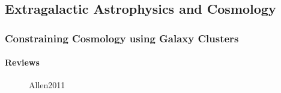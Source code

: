 \documentclass[letterpaper,10pt,english]{sphinxmanual}
\begin{document}
\subsection{Extragalactic Astrophysics and Cosmology}
\label{\detokenize{astro_reading:extragalactic-astrophysics-and-cosmology}}

\subsubsection{Constraining Cosmology using Galaxy Clusters}
\label{\detokenize{resource/astro/reference/cluster_cosmology:constraining-cosmology-using-galaxy-clusters}}\label{\detokenize{resource/astro/reference/cluster_cosmology::doc}}

\paragraph{Reviews}
\label{\detokenize{resource/astro/reference/cluster_cosmology:reviews}}
\begin{figure}[htbp]
\centering
\capstart

\noindent{}
\caption{Allen2011}\label{\detokenize{resource/astro/reference/cluster_cosmology:id1}}\end{figure}
\end{document}
